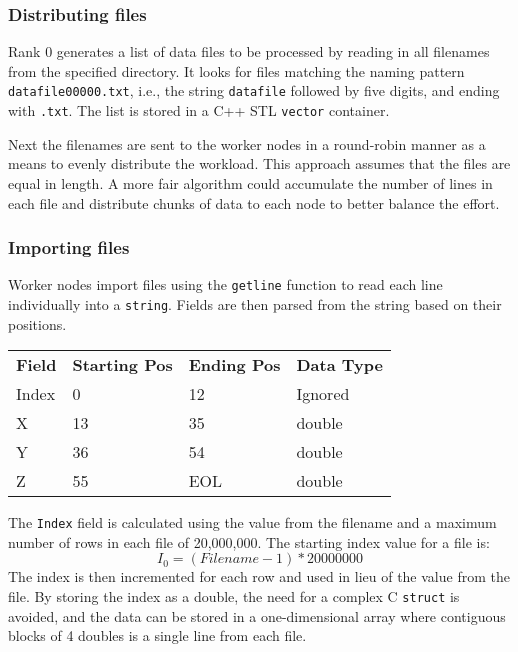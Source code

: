 \documentclass{article}
\begin{document}
\subsubsection{Distributing files}
% 
Rank 0 generates a list of data files to be processed by reading in all filenames from the specified directory. It looks for files matching the naming pattern \texttt{datafile00000.txt}, i.e., the string \texttt{datafile} followed by five digits, and ending with \texttt{.txt}. The list is stored in a C++ STL \texttt{vector} container.

Next the filenames are sent to the worker nodes in a round-robin manner as a means to evenly distribute the workload. This approach assumes that the files are equal in length. A more fair algorithm could accumulate the number of lines in each file and distribute chunks of data to each node to better balance the effort.

\subsubsection{Importing files}
% 
Worker nodes import files using the \texttt{getline} function to read each line individually into a \texttt{string}. Fields are then parsed from the string based on their positions.

\begin{tabular}{l l l l}
\textbf{Field} & \textbf{Starting Pos} & \textbf{Ending Pos} & \textbf{Data Type} \\
Index &  0 & 12  & Ignored \\
X     & 13 & 35  & double  \\
Y     & 36 & 54  & double  \\
Z     & 55 & EOL & double \\
\end{tabular}
The \texttt{Index} field is calculated using the value from the filename and a maximum number of rows in each file of 20,000,000. The starting index value for a file is:
$$I_0 = (Filename - 1) * 20000000$$
The index is then incremented for each row and used in lieu of the value from the file. By storing the index as a double, the need for a complex C \texttt{struct} is avoided, and the data can be stored in a one-dimensional array where contiguous blocks of 4 doubles is a single line from each file.

\end{document}
